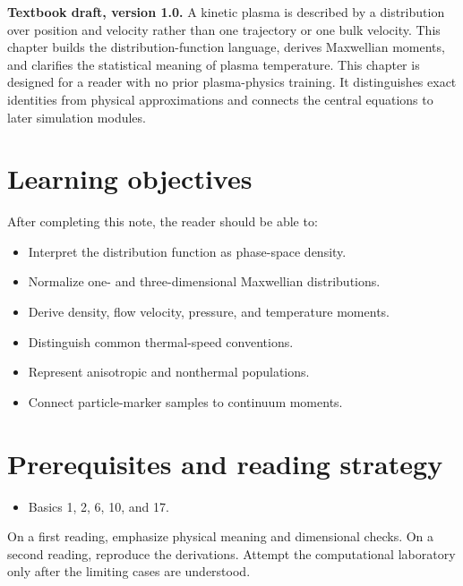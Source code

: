 \documentclass[11pt]{article}
\begin{document}

\begin{overviewbox}
\textbf{Textbook draft, version 1.0.} A kinetic plasma is described by a distribution over position and velocity rather than one trajectory or one bulk velocity. This chapter builds the distribution-function language, derives Maxwellian moments, and clarifies the statistical meaning of plasma temperature. This chapter is designed for a reader with no prior plasma-physics training. It distinguishes exact identities from physical approximations and connects the central equations to later simulation modules.
\end{overviewbox}

\ProjectTOC

\section{Learning objectives}
After completing this note, the reader should be able to:
\begin{itemize}[leftmargin=1.6em]
\item Interpret the distribution function as phase-space density.
\item Normalize one- and three-dimensional Maxwellian distributions.
\item Derive density, flow velocity, pressure, and temperature moments.
\item Distinguish common thermal-speed conventions.
\item Represent anisotropic and nonthermal populations.
\item Connect particle-marker samples to continuum moments.
\end{itemize}

\section{Prerequisites and reading strategy}
\begin{itemize}[leftmargin=1.6em]
\item Basics 1, 2, 6, 10, and 17.
\end{itemize}
On a first reading, emphasize physical meaning and dimensional checks. On a second reading, reproduce the derivations. Attempt the computational laboratory only after the limiting cases are understood.
\end{document}
